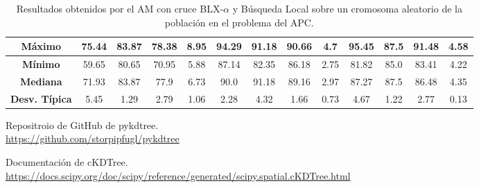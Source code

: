 \documentclass[11pt,a4paper]{article}
\begin{document}
\begin{table}[H]
{\begin{tabular}{c|c|c|c|c|c|c|c|c|c|c|c|c|}
\multicolumn{1}{|c|}{\textbf{Máximo}}       & 75.44             & 83.87                   & 78.38         & 8.95       & 94.29             & 91.18          & 90.66         & 4.7        & 95.45             & 87.5           & 91.48         & 4.58       \\ \hline
\multicolumn{1}{|c|}{\textbf{Mínimo}}       & 59.65             & 80.65                   & 70.95         & 5.88       & 87.14             & 82.35          & 86.18         & 2.75       & 81.82             & 85.0           & 83.41         & 4.22       \\ \hline
\multicolumn{1}{|c|}{\textbf{Mediana}}      & 71.93             & 83.87                   & 77.9          & 6.73       & 90.0              & 91.18          & 89.16         & 2.97       & 87.27             & 87.5           & 86.48         & 4.35       \\ \hline
\multicolumn{1}{|c|}{\textbf{Desv. Típica}} & 5.45              & 1.29                    & 2.79          & 1.06       & 2.28              & 4.32           & 1.66          & 0.73       & 4.67              & 1.22           & 2.77          & 0.13       \\ \hline
\end{tabular}
}%
\caption{Resultados obtenidos por el AM con cruce BLX-$\alpha$ y Búsqueda Local sobre un cromosoma aleatorio  de la población
en el problema del APC.}
\end{table}


\newpage

\begin{thebibliography}{5}

Repositroio de GitHub de pykdtree.
\\\url{https://github.com/storpipfugl/pykdtree}

Documentación de cKDTree.
\\\url{https://docs.scipy.org/doc/scipy/reference/generated/scipy.spatial.cKDTree.html}

\end{thebibliography}
\end{document}

